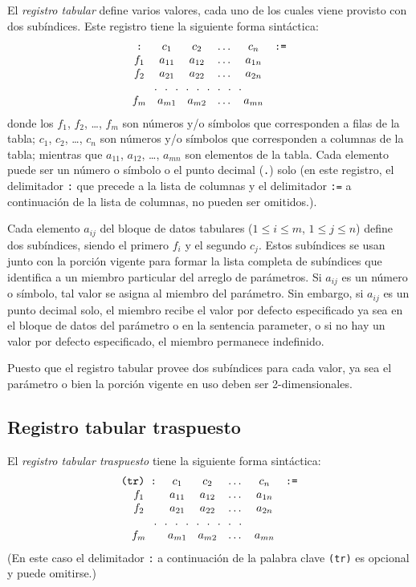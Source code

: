 \documentclass[11pt,spanish]{report}
\begin{document}
El {\it registro tabular} define varios valores, cada uno de los cuales viene provisto con dos subíndices. Este registro tiene la siguiente forma sintáctica:
$$\begin{array}{cccccc}
\mbox{{\tt:}}&c_1&c_2&\dots&c_n&\mbox{{\tt:=}}\\
f_1&a_{11}&a_{12}&\dots&a_{1n}&\\
f_2&a_{21}&a_{22}&\dots&a_{2n}&\\
\multicolumn{5}{c}{.\ \ .\ \ .\ \ .\ \ .\ \ .\ \ .\ \ .\ \ .}&\\
f_m&a_{m1}&a_{m2}&\dots&a_{mn}&\\
\end{array}$$
donde los $f_1$, $f_2$, \dots, $f_m$ son números y/o símbolos que corresponden a filas de la tabla; $c_1$, $c_2$, \dots, $c_n$ son números y/o símbolos que corresponden a columnas de la tabla; mientras que $a_{11}$, $a_{12}$, \dots, $a_{mn}$ son elementos de la tabla. Cada elemento puede ser un número o símbolo o el punto decimal ({\tt.}) solo (en este registro, el delimitador {\tt:} que precede a la lista de columnas y el delimitador {\tt:=} a continuación de la lista de columnas, no pueden ser omitidos.).

Cada elemento $a_{ij}$ del bloque de datos tabulares ($1\leq i\leq m$,
$1\leq j\leq n$) define dos subíndices, siendo el primero $f_i$ y el segundo $c_j$. Estos subíndices se usan junto con la porción vigente para formar la lista completa de subíndices que identifica a un miembro particular del arreglo de parámetros. Si $a_{ij}$ es un número o símbolo, tal valor se asigna al miembro del parámetro. Sin embargo, si $a_{ij}$ es un punto decimal solo, el miembro recibe el valor por defecto especificado ya sea en el bloque de datos del parámetro o en la sentencia parameter, o si no hay un valor por defecto especificado, el miembro permanece indefinido.

Puesto que el registro tabular provee dos subíndices para cada valor, ya sea el parámetro o bien la porción vigente en uso deben ser 2-dimensionales.

\subsection{Registro tabular traspuesto}

El {\it registro tabular traspuesto} tiene la siguiente forma sintáctica:
$$\begin{array}{cccccc}
\mbox{{\tt(tr) :}}&c_1&c_2&\dots&c_n&\mbox{{\tt:=}}\\
f_1&a_{11}&a_{12}&\dots&a_{1n}&\\
f_2&a_{21}&a_{22}&\dots&a_{2n}&\\
\multicolumn{5}{c}{.\ \ .\ \ .\ \ .\ \ .\ \ .\ \ .\ \ .\ \ .}&\\
f_m&a_{m1}&a_{m2}&\dots&a_{mn}&\\
\end{array}$$
(En este caso el delimitador {\tt:} a continuación de la palabra clave {\tt (tr)} es opcional y puede omitirse.)
\end{document}
